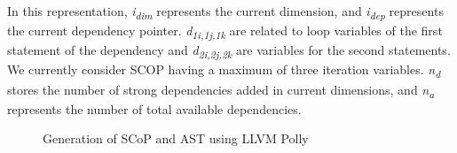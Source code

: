 \documentclass[logo,msc]{infthesis}           %
\begin{document}
In this representation, \textit{i\textsubscript{dim}} represents the current dimension, and \textit{i\textsubscript{dep}} represents the current dependency pointer. \textit{d\textsubscript{1i,1j,1k}} are related to loop variables of the first statement of the dependency and \textit{d\textsubscript{2i,2j,2k}} are variables for the second statements. We currently consider SCOP having a maximum of three iteration variables. \textit{n\textsubscript{d}} stores the number of strong dependencies added in current dimensions, and \textit{n\textsubscript{a}}
represents the number of total available dependencies.

\begin{figure}[!tb]
  \centering
  \hfill

  \centering
  \hfill
  
  \caption{Generation of SCoP and AST using LLVM Polly}
\end{figure}
\end{document}
